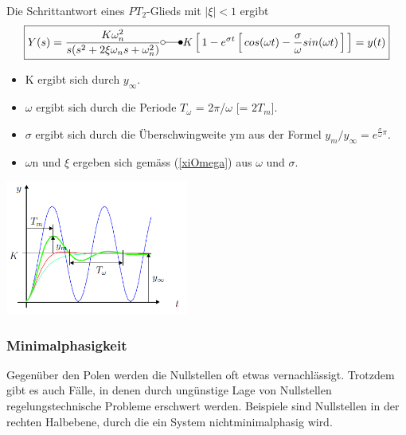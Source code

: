 Die Schrittantwort eines $PT_2$-Glieds mit $|\xi| < 1$ ergibt
\begin{equation}
\boxed{Y(s)=\frac{K\omega^2_n}{s(s^2+2\xi\omega_n s +\omega^2_n)}\laplace K\mathop{\Big[}1-e^{\sigma t}\mathop{\Big[}cos(\omega t)-\frac{\sigma}{\omega}sin(\omega t)\mathop{\Big]}\mathop{\Big]}=y(t)}
\end{equation}
\begin{multicols}{2}
\begin{itemize}
\item K ergibt sich durch $y_\infty$.
\item $\omega$ ergibt sich durch die Periode $T_\omega$ = 2$\pi$/$\omega$ [= $2T_m$].
\item $\sigma$ ergibt sich durch die Überschwingweite ym aus der Formel $y_m/y_\infty = e^{
\frac{\sigma}{\omega}\pi}$.
\item $\omega$n und $\xi$ ergeben sich gemäss (\ref{xiOmega}) aus $\omega$ und $\sigma$.
\end{itemize}
	\columnbreak
\begin{center}
	\includegraphics[width=6cm]{./images/pt2.png}
\end{center}
\end{multicols}

\subsubsection{Minimalphasigkeit}
Gegenüber den Polen werden die Nullstellen oft etwas vernachlässigt. Trotzdem
gibt es auch Fälle, in denen durch ungünstige Lage von Nullstellen regelungstechnische
Probleme erschwert werden. Beispiele sind Nullstellen in der rechten Halbebene,
durch die ein System nichtminimalphasig wird.

